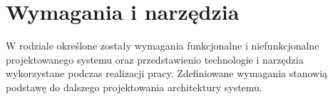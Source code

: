 \documentclass[a4paper,twoside,12pt]{book}
\newtheorem{Definition}{Definicja}
\newtheorem{Example}{Przykład}
\newtheorem{Theorem}{Twierdzenie}
\begin{document}
%
%





\chapter{Wymagania i narzędzia}
\label{ch:wymagania-i-narzedzia}
W rodziale określone zostały wymagania funkcjonalne i 
niefunkcjonalne projektowanego systemu oraz przedstawienio technologie i 
narzędzia wykorzystane podczas realizacji pracy. Zdefiniowane wymagania 
stanowią podstawę do dalszego projektowania architektury systemu.


\end{document}
